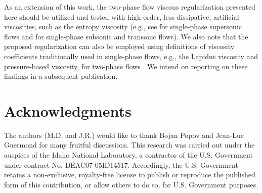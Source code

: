 \documentclass[preprint,10pt]{elsarticle}
\begin{document}
As an extension of this work, the two-phase flow viscous regularization presented here should be utilized and tested with high-order, less dissipative, artificial viscosities, 
such as the entropy viscosity (e.g., see \cite{jlg1} for single-phase supersonic flows and \cite{Marco_paper_low_mach} for single-phase subsonic and transonic flows). 
We also note that the proposed regularization can also be employed using definitions of viscosity coefficients traditionally used in single-phase flows, e.g., 
the Lapidus viscosity \cite{Lapidus_paper, Lapidus_book} and pressure-based viscosity, for two-phase flows \cite{PBV_book}. We intend on reporting on these findings in 
a subsequent publication. 
%
\section*{Acknowledgments} 
The authors (M.D. and J.R.) would like to thank Bojan Popov and Jean-Luc Guermond for many fruitful discussions.  
This research was carried out under the auspices of the Idaho National Laboratory, a contractor of the U.S. Government under contract No. DEAC07-05ID14517.  Accordingly, the U.S. Government retains a non-exclusive, royalty-free license to publish or reproduce the published form of this contribution, or allow others to do so, for U.S. Government purposes.

\clearpage

\end{document}
